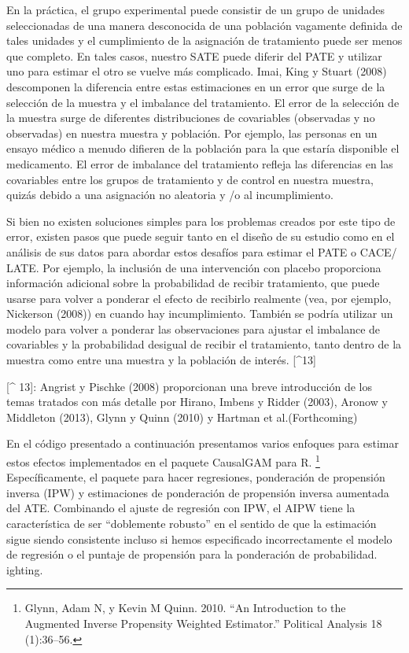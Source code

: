 \documentclass[
]{article}
\begin{document}
En la práctica, el grupo experimental puede consistir de un grupo de
unidades seleccionadas de una manera desconocida de una población
vagamente definida de tales unidades y el cumplimiento de la asignación
de tratamiento puede ser menos que completo. En tales casos, nuestro
SATE puede diferir del PATE y utilizar uno para estimar el otro se
vuelve más complicado. Imai, King y Stuart (2008) descomponen la
diferencia entre estas estimaciones en un error que surge de la
selección de la muestra y el imbalance del tratamiento. El error de la
selección de la muestra surge de diferentes distribuciones de
covariables (observadas y no observadas) en nuestra muestra y población.
Por ejemplo, las personas en un ensayo médico a menudo difieren de la
población para la que estaría disponible el medicamento. El error de
imbalance del tratamiento refleja las diferencias en las covariables
entre los grupos de tratamiento y de control en nuestra muestra, quizás
debido a una asignación no aleatoria y /o al incumplimiento.

Si bien no existen soluciones simples para los problemas creados por
este tipo de error, existen pasos que puede seguir tanto en el diseño de
su estudio como en el análisis de sus datos para abordar estos desafíos
para estimar el PATE o CACE/ LATE. Por ejemplo, la inclusión de una
intervención con placebo proporciona información adicional sobre la
probabilidad de recibir tratamiento, que puede usarse para volver a
ponderar el efecto de recibirlo realmente (vea, por ejemplo, Nickerson
(2008)) en cuando hay incumplimiento. También se podría utilizar un
modelo para volver a ponderar las observaciones para ajustar el
imbalance de covariables y la probabilidad desigual de recibir el
tratamiento, tanto dentro de la muestra como entre una muestra y la
población de interés. {[}\^{}13{]}

{[}\^{} 13{]}: Angrist y Pischke (2008) proporcionan una breve
introducción de los temas tratados con más detalle por Hirano, Imbens y
Ridder (2003), Aronow y Middleton (2013), Glynn y Quinn (2010) y Hartman
et al.(Forthcoming)

En el código presentado a continuación presentamos varios enfoques para
estimar estos efectos implementados en el paquete CausalGAM para R.
\footnote{Glynn, Adam N, y Kevin M Quinn. 2010. ``An Introduction to the
  Augmented Inverse Propensity Weighted Estimator.'' Political Analysis
  18 (1):36--56.} Específicamente, el paquete para hacer regresiones,
ponderación de propensión inversa (IPW) y estimaciones de ponderación de
propensión inversa aumentada del ATE. Combinando el ajuste de regresión
con IPW, el AIPW tiene la característica de ser ``doblemente robusto''
en el sentido de que la estimación sigue siendo consistente incluso si
hemos especificado incorrectamente el modelo de regresión o el puntaje
de propensión para la ponderación de probabilidad. ighting.
\end{document}
